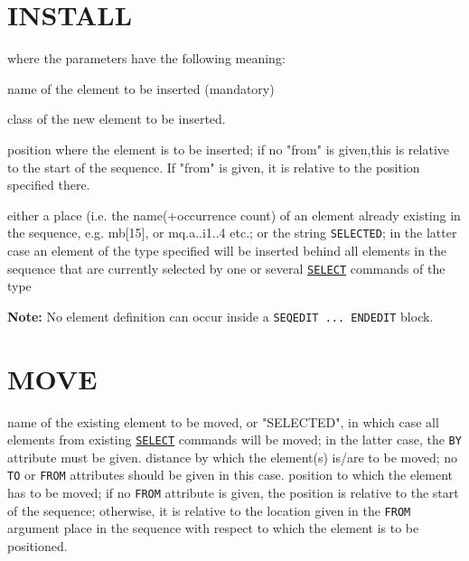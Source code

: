 \section{INSTALL}
\label{sec:install}
where the parameters have the following meaning: 
\begin{madlist}
    name of the element to be inserted (mandatory) 

    class of the new element to be inserted. 

    position where the element is to be inserted; if no "from"
     is given,this is relative to the start of the sequence. If "from"
     is given, it is relative to the position specified there. 

    either a place (i.e. the name(+occurrence count) of an
     element already existing in the sequence, e.g. mb[15], or
     mq.a..i1..4 etc.; or the string \texttt{SELECTED}; in the latter
     case an element of the type specified will be inserted behind all
     elements in the sequence that are currently selected by one or several
     \hyperref[sec:select]{\texttt{SELECT}} commands of the type 
\end{madlist}

\textbf{Note:} No element definition can occur inside a \texttt{SEQEDIT
  ... ENDEDIT} block.


\section{MOVE}
\label{sec:move}
\begin{madlist}
   name of the existing element to be moved, or
  "SELECTED", in which case all elements from existing
  \hyperref[sec:select]{\texttt{SELECT}} commands will be moved;
  in the latter case, the \texttt{BY} attribute must be given.  
   distance by which the element(s) is/are to be moved; no
  \texttt{TO} or \texttt{FROM} attributes should be given in this case.  
   position to which the element has to be moved; if no
  \texttt{FROM} attribute is given, the position is relative to the
  start of the sequence; otherwise, it is relative to the location
  given in the \texttt{FROM} argument   
   place in the sequence with respect to which the element
  is to be positioned.  
\end{madlist}

